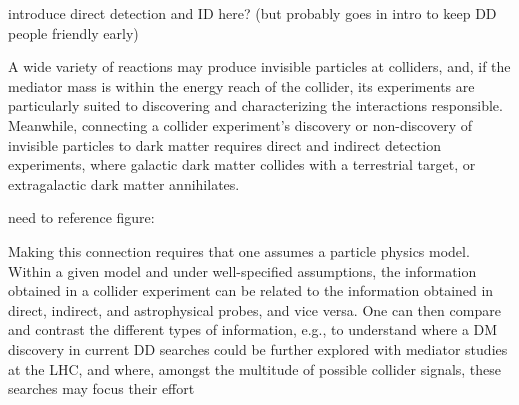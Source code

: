 
introduce direct detection and ID here? (but probably goes in intro to keep DD people friendly early)

A wide variety of reactions may produce invisible particles at colliders, and, if the mediator mass is within the energy reach of the collider, its experiments are particularly suited to discovering and characterizing the interactions responsible.  Meanwhile, connecting a collider experiment's discovery or non-discovery of invisible particles to dark matter requires direct and indirect detection experiments, where galactic dark matter collides with a terrestrial target, or extragalactic dark matter annihilates.

need to reference figure:


Making this connection requires that one assumes a particle physics model.
Within a given model and under well-specified assumptions, the information obtained in a collider experiment can be related to the information obtained in direct, indirect, and astrophysical probes, and vice versa.
One can then compare and contrast the different types of information, e.g., to understand where a DM discovery in current DD searches could be further explored with mediator studies at the LHC, and where, amongst the multitude of possible collider signals, these searches may focus their effort



